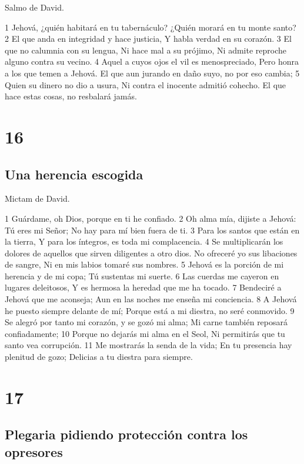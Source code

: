 Salmo de David.

1 Jehová, ¿quién habitará en tu tabernáculo?
¿Quién morará en tu monte santo?
2 El que anda en integridad y hace justicia,
Y habla verdad en su corazón.
3 El que no calumnia con su lengua,
Ni hace mal a su prójimo,
Ni admite reproche alguno contra su vecino.
4 Aquel a cuyos ojos el vil es menospreciado,
Pero honra a los que temen a Jehová.
El que aun jurando en daño suyo, no por eso cambia;
5 Quien su dinero no dio a usura,
Ni contra el inocente admitió cohecho.
El que hace estas cosas, no resbalará jamás.

\chapter{16}

\section*{Una herencia escogida}

Mictam de David.

1 Guárdame, oh Dios, porque en ti he confiado.
2 Oh alma mía, dijiste a Jehová:
Tú eres mi Señor;
No hay para mí bien fuera de ti.
3 Para los santos que están en la tierra,
Y para los íntegros, es toda mi complacencia.
4 Se multiplicarán los dolores de aquellos que sirven diligentes a otro dios.
No ofreceré yo sus libaciones de sangre,
Ni en mis labios tomaré sus nombres.
5 Jehová es la porción de mi herencia y de mi copa;
Tú sustentas mi suerte.
6 Las cuerdas me cayeron en lugares deleitosos,
Y es hermosa la heredad que me ha tocado.
7 Bendeciré a Jehová que me aconseja;
Aun en las noches me enseña mi conciencia.
8 A Jehová he puesto siempre delante de mí;
Porque está a mi diestra, no seré conmovido.
9 Se alegró por tanto mi corazón, y se gozó mi alma;
Mi carne también reposará confiadamente;
10 Porque no dejarás mi alma en el Seol,
Ni permitirás que tu santo vea corrupción.
11 Me mostrarás la senda de la vida;
En tu presencia hay plenitud de gozo;
Delicias a tu diestra para siempre.

\chapter{17}

\section*{Plegaria pidiendo protección contra los opresores}

